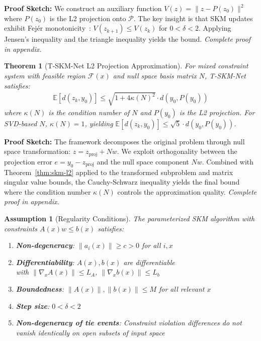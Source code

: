 \documentclass[letterpaper]{article} %
\newtheorem{theorem}{Theorem}
\newtheorem{assumption}{Assumption}
\begin{document}
\textbf{Proof Sketch:} We construct an auxiliary function $V(z) = \|z - P(z_0)\|^2$ where $P(z_0)$ is the L2 projection onto $\mathcal{P}$. The key insight is that SKM updates exhibit Fejér monotonicity~\cite{combettes2008fejer}: $V(z_{k+1}) \leq V(z_k)$ for $0 < \delta < 2$. Applying Jensen's inequality and the triangle inequality yields the bound. \textit{Complete proof in appendix.}

\begin{theorem}[T-SKM-Net L2 Projection Approximation]
\label{thm:tskm-l2}
For mixed constraint system with feasible region $\mathcal{F}(x)$ and null space basis matrix $N$, T-SKM-Net satisfies:
\begin{align}
\mathbb{E}[d(z_k, y_0)] \leq \sqrt{1+4\kappa(N)^2} \cdot d(y_0, P(y_0))
\end{align}
where $\kappa(N)$ is the condition number of $N$ and $P(y_0)$ is the L2 projection. For SVD-based $N$, $\kappa(N)=1$, yielding $\mathbb{E}[d(z_k, y_0)] \leq \sqrt{5} \cdot d(y_0, P(y_0))$.
\end{theorem}

\textbf{Proof Sketch:} The framework decomposes the original problem through null space transformation: $z = z_{\text{proj}} + Nw$. We exploit orthogonality between the projection error $e = y_0 - z_{\text{proj}}$ and the null space component $Nw$. Combined with Theorem~\ref{thm:skm-l2} applied to the transformed subproblem and matrix singular value bounds, the Cauchy-Schwarz inequality yields the final bound where the condition number $\kappa(N)$ controls the approximation quality. \textit{Complete proof in appendix.}

\begin{assumption}[Regularity Conditions]
\label{assump:regularity}
The parameterized SKM algorithm with constraints $A(x)w \leq b(x)$ satisfies:
\begin{enumerate}
\item \textbf{Non-degeneracy}: $\|a_i(x)\| \geq c > 0$ for all $i,x$
\item \textbf{Differentiability}: $A(x), b(x)$ are differentiable\\ with $\|\nabla_x A(x)\| \leq L_A$, $\|\nabla_x b(x)\| \leq L_b$
\item \textbf{Boundedness}: $\|A(x)\|, \|b(x)\| \leq M$ for all relevant $x$
\item \textbf{Step size}: $0 < \delta < 2$
\item \textbf{Non-degeneracy of tie events}: Constraint violation differences do not vanish identically on open subsets of input space
\end{enumerate}
\end{assumption}
\end{document}
